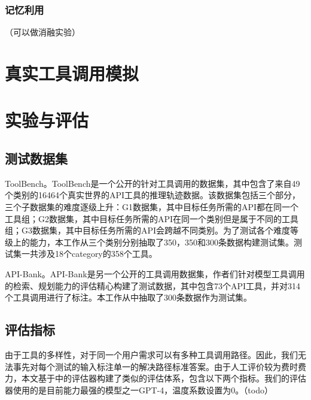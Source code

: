 \subsubsection{记忆利用}
（可以做消融实验）

\section{真实工具调用模拟}
\label{sec:real_tool_simulation}

\section{实验与评估}
\subsection{测试数据集}
\label{subsec:test_dataset}

ToolBench。ToolBench\cite{Qin2023}是一个公开的针对工具调用的数据集，其中包含了来自49个类别的16464个真实世界的API工具的推理轨迹数据。该数据集包括三个部分，三个子数据集的难度逐级上升：G1数据集，其中目标任务所需的API都在同一个工具组；G2数据集，其中目标任务所需的API在同一个类别但是属于不同的工具组；G3数据集，其中目标任务所需的API会跨越不同类别。为了测试各个难度等级上的能力，本工作从三个类别分别抽取了350，350和300条数据构建测试集。测试集一共涉及18个category的358个工具。

API-Bank。API-Bank\cite{Li2023}是另一个公开的工具调用数据集，作者们针对模型工具调用的检索、规划能力的评估精心构建了测试数据，其中包含73个API工具，并对314个工具调用进行了标注。本工作从中抽取了300条数据作为测试集。

\subsection{评估指标}
由于工具的多样性，对于同一个用户需求可以有多种工具调用路径。因此，我们无法事先对每个测试的输入标注单一的解决路径标准答案。由于人工评价较为费时费力，本文基于\cite{Tang2023}中的评估器构建了类似的评估体系，包含以下两个指标。我们的评估器使用的是目前能力最强的模型之一GPT-4，温度系数设置为0。（todo）

